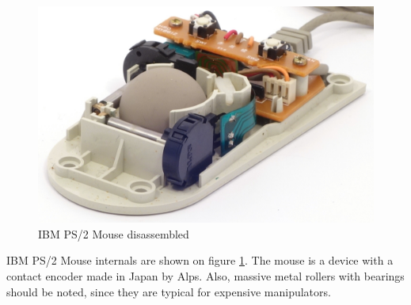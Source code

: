 \documentclass[11pt, a4paper]{article}
\begin{document}
\begin{figure}[h]
    \centering
    \includegraphics[scale=0.7]{1987_ibm_ps2_mouse/razob1.jpg} 
    \caption{IBM PS/2 Mouse disassembled}
    \label{fig:IBMPS2Inside}
\end{figure}

IBM PS/2 Mouse internals are shown on figure \ref{fig:IBMPS2Inside}. The mouse is a device with a contact encoder made in Japan by Alps. Also, massive metal rollers with bearings should be noted, since they are typical for expensive manipulators.
\end{document}

